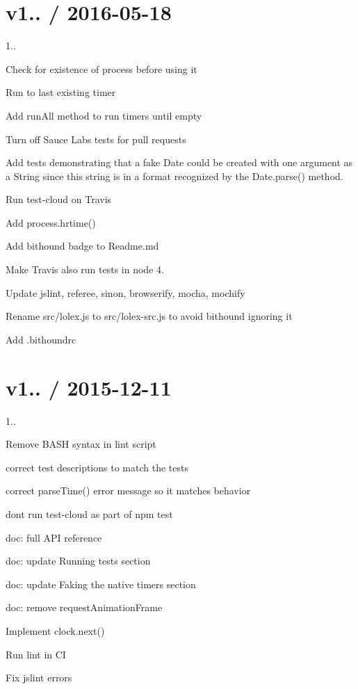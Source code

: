 \section*{v1.. / 2016-\/05-\/18 }


\begin{DoxyItemize}
\item 1..
\item Check for existence of {\ttfamily process} before using it
\item Run to last existing timer
\item Add run\+All method to run timers until empty
\item Turn off Sauce Labs tests for pull requests
\item Add tests demonstrating that a fake Date could be created with one argument as a String since this string is in a format recognized by the Date.\+parse() method.
\item Run test-\/cloud on Travis
\item Add process.\+hrtime()
\item Add bithound badge to Readme.\+md
\item Make Travis also run tests in node 4.
\item Update jslint, referee, sinon, browserify, mocha, mochify
\item Rename src/lolex.\+js to src/lolex-\/src.\+js to avoid bithound ignoring it
\item Add .bithoundrc
\end{DoxyItemize}

\section*{v1.. / 2015-\/12-\/11 }


\begin{DoxyItemize}
\item 1..
\item Remove B\+A\+SH syntax in lint script
\item correct test descriptions to match the tests
\item correct parse\+Time() error message so it matches behavior
\item don\textquotesingle{}t run test-\/cloud as part of npm test
\item doc\+: full A\+PI reference
\item doc\+: update \textquotesingle{}Running tests\textquotesingle{} section
\item doc\+: update \textquotesingle{}Faking the native timers\textquotesingle{} section
\item doc\+: remove request\+Animation\+Frame
\item Implement clock.\+next()
\item Run lint in CI
\item Fix jslint errors
\end{DoxyItemize}

